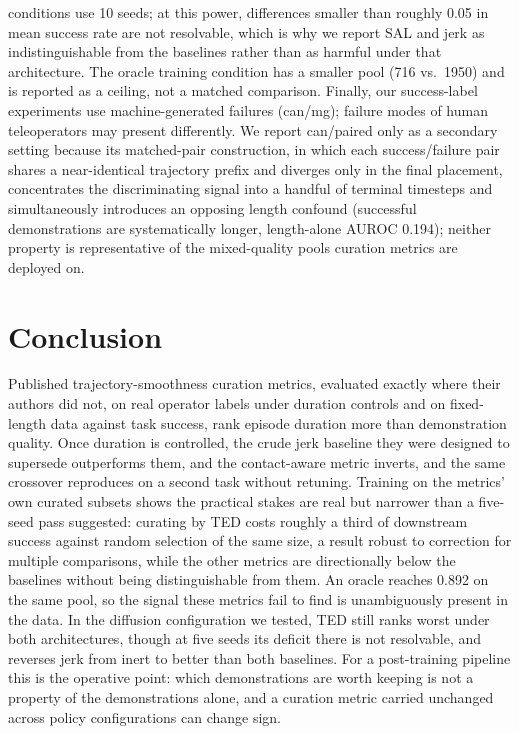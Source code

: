 \documentclass{article}
\begin{document}
conditions use 10 seeds; at this power, differences smaller than roughly
0.05 in mean success rate are not resolvable, which is why we report SAL and
jerk as indistinguishable from the baselines rather than as harmful under
that architecture. The oracle training
condition has a smaller pool (716 vs.\ 1950) and is reported as a ceiling,
not a matched comparison. Finally, our success-label experiments use
machine-generated failures (can/mg); failure modes of human teleoperators
may present differently. We report can/paired only as a secondary setting
because its matched-pair construction, in which each success/failure pair
shares a near-identical trajectory prefix and diverges only in the final
placement, concentrates the discriminating signal into a handful of
terminal timesteps and simultaneously introduces an opposing length
confound (successful demonstrations are systematically longer, length-alone
AUROC 0.194); neither property is representative of the mixed-quality pools
curation metrics are deployed on.

\section{Conclusion}

Published trajectory-smoothness curation metrics, evaluated exactly where
their authors did not, on real operator labels under duration controls and
on fixed-length data against task success, rank episode duration more than
demonstration quality. Once duration is controlled, the crude jerk baseline
they were designed to supersede outperforms them, and the contact-aware
metric inverts, and the same crossover reproduces on a second task without
retuning. Training on the metrics' own curated subsets shows the practical
stakes are real but narrower than a five-seed pass suggested: curating by
TED costs roughly a third of downstream success against random selection of
the same size, a result robust to correction for multiple comparisons, while
the other metrics are directionally below the baselines without being
distinguishable from them. An oracle reaches 0.892 on the same pool, so the
signal these metrics fail to find is unambiguously present in the data.
In the diffusion configuration we tested, TED still ranks worst under both
architectures, though at five seeds its deficit there is not resolvable,
and reverses jerk from inert to better than both baselines. For a
post-training pipeline this is the operative point: which demonstrations are
worth keeping is not a property of the demonstrations alone, and a curation
metric carried unchanged across policy configurations can change sign.
\end{document}
